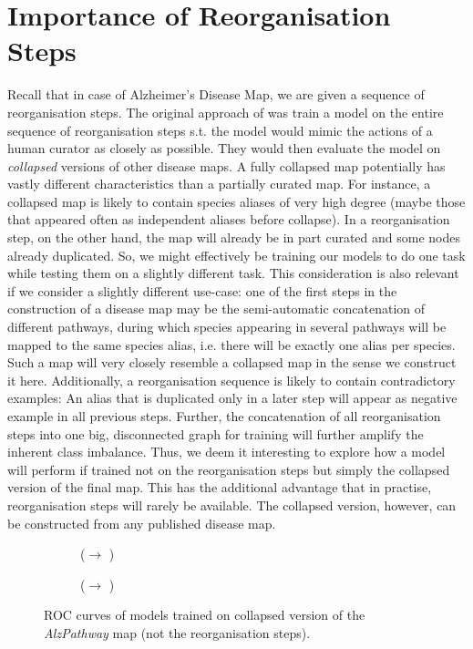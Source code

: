 \documentclass[
	fontsize=10pt, %
	twoside=false, %
	secnumdepth=1, %
  toc=indentunnumbered %
]{kaobook}
\begin{document}
\section{Importance of Reorganisation Steps}
\label{sec:importance-reorganisation-steps}
Recall that in case of Alzheimer's Disease Map, we are
given a sequence of reorganisation steps. The original approach of \nielsen{} was
train a model on the entire sequence of reorganisation steps s.t. the model
would mimic the actions of a human curator as closely as possible. They would
then evaluate the model on \textit{collapsed} versions of other disease maps.
%
A fully collapsed map potentially has vastly different characteristics than a
partially curated map. For instance, a collapsed map is likely to contain
species aliases of very high degree (maybe those that appeared often as
independent aliases before collapse). In a reorganisation step, on the other
hand, the map will already be in part curated and some nodes already duplicated.
%
So, we might effectively be training our models to do one task while testing
them on a slightly different task.
%
This consideration is also relevant if we consider a slightly different
use-case: one of the first steps in the construction of a disease map may be the
semi-automatic concatenation of different pathways, during which species
appearing in several pathways will be mapped to the same species alias, i.e.
there will be exactly one alias per species. Such a map will very closely
resemble a collapsed map in the sense we construct it here.
%
Additionally, a reorganisation sequence is likely to contain contradictory
examples: An alias that is duplicated only in a later step will appear as
negative example in all previous steps. Further, the concatenation of all
reorganisation steps into one big, disconnected graph for training
will further amplify the inherent class imbalance.
%
Thus, we deem it interesting to explore how a model will perform if trained not
on the reorganisation steps but simply the collapsed version of the final map.
%
This has the additional advantage that in practise, reorganisation steps will
rarely be available. The collapsed version, however, can be constructed from any
published disease map.

\begin{figure}[h]
  \centering
  \begin{subfigure}[h]{0.48\linewidth}
    \caption{(\ADLast $\rightarrow$ \PDMap)}
  \end{subfigure}
  \begin{subfigure}[h]{0.48\linewidth}
    \caption{(\ADLast $\rightarrow$ \ReconMap{})}
  \end{subfigure}
  \caption{ROC curves of models trained on collapsed version of the
    \textit{AlzPathway} map (not the reorganisation steps).}
  \label{fig:importance-reorganisation-steps}
\end{figure}
\end{document}
